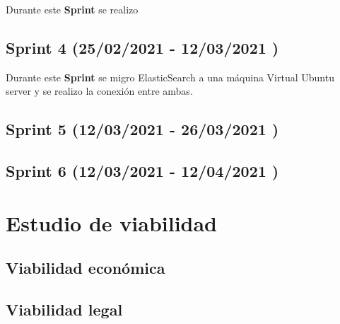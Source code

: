 Durante este \textbf{Sprint} se realizo 
\subsection{Sprint 4   (25/02/2021 - 12/03/2021 )}
Durante este \textbf{Sprint} se migro ElasticSearch a una máquina Virtual Ubuntu server y se realizo la conexión entre ambas.

\subsection{Sprint 5   (12/03/2021 - 26/03/2021 )}



\subsection{Sprint 6   (12/03/2021 - 12/04/2021 )}


\section{Estudio de viabilidad}

\subsection{Viabilidad económica}

\subsection{Viabilidad legal}


